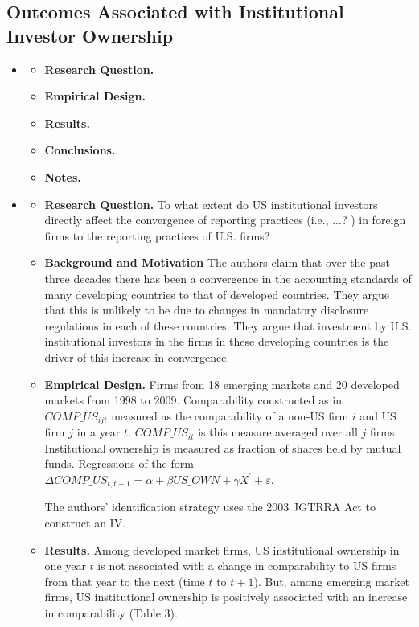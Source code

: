 \documentclass[12pt, letterpaper]{article}
\begin{document}
\subsection{Outcomes Associated with Institutional Investor Ownership}
\begin{itemize}
\item \cite{}
   \begin{itemize}
    \item \textbf{Research Question.}
    \item \textbf{Empirical Design.}
    \item \textbf{Results.}
    \item \textbf{Conclusions.}
    \item \textbf{Notes.} 
    \end{itemize}

\item \cite{fangetal2015}
   \begin{itemize}
    \item \textbf{Research Question.} To what extent do US institutional investors directly affect 
the convergence of reporting practices (i.e., ...? ) in foreign firms to the reporting practices of U.S. firms?

\item \textbf{Background and Motivation} The authors claim that over the past three decades there has been a convergence in the accounting standards of many developing countries to that of developed countries. They argue that this is unlikely to be due to changes in mandatory disclosure regulations in each of these countries. They argue that investment by U.S. institutional investors in the firms in these developing countries is the driver of this increase in convergence.

    \item \textbf{Empirical Design.} Firms from 18 emerging markets and 20 developed markets from 
1998 to 2009. Comparability constructed as in \cite{defrancoetal2011}. $COMP\_US_{ijt}$ measured as 
the comparability of a non-US firm $i$ and US firm $j$ in a year $t$. $COMP\_US_{it}$ is this 
measure averaged over all $j$ firms. Institutional ownership is measured as fraction of shares held 
by mutual funds. Regressions of the form $\Delta COMP\_US_{t, t+1} = \alpha + \beta US\_OWN + \gamma 
X^{\prime} + \varepsilon$.

The authors' identification strategy uses the 2003 JGTRRA Act to construct an IV.

    \item \textbf{Results.} Among developed market firms, US institutional ownership in one year $t$ 
is not associated with a change in comparability to US firms from that year to the next (time $t$ to 
$t+1$). But, among emerging market firms, US institutional ownership is positively associated with 
an increase in comparability (Table 3).


\end{itemize}
\end{itemize}
\end{document}
